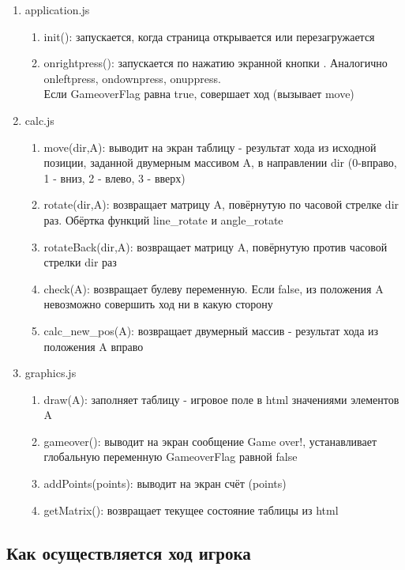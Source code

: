 \documentclass[a4paper,12pt]{article}
\newcommand{\lk}{\guillemotleft}
\newcommand{\rk}{\guillemotright}
\begin{document}
\begin{enumerate}
\item{application.js}
	\begin{enumerate}
	\item{init():} запускается, когда страница открывается или перезагружается
	\item{onrightpress():} запускается по нажатию экранной кнопки \rk. 			Аналогично onleftpress, ondownpress, onuppress.\\
	Если GameoverFlag равна true, совершает ход (вызывает move)
	\end{enumerate}
\item{calc.js}
	\begin{enumerate}
	\item{move(dir,A):} выводит на экран таблицу - результат хода из исходной 				позиции, заданной двумерным массивом A, в направлении dir (0-вправо, 1 - вниз, 2 		- влево, 3 - вверх) 
	\item{rotate(dir,A):} возвращает матрицу A, повёрнутую по часовой стрелке dir раз. 		Обёртка функций line\_rotate и angle\_rotate
	\item{rotateBack(dir,A):} возвращает матрицу A, повёрнутую против часовой 			стрелки dir раз
	\item{check(A):} возвращает булеву переменную. Если false, из положения A 			невозможно совершить ход ни в какую сторону
	\item{calc\_new\_pos(A):} возвращает двумерный массив - результат хода из положения A вправо
	\end{enumerate}
\item{graphics.js}
	\begin{enumerate}
	\item{draw(A):} заполняет таблицу - игровое поле в html значениями элементов A
	\item{gameover():} выводит на экран сообщение \lk Game over!\rk, устанавливает глобальную переменную GameoverFlag равной false
	\item{addPoints(points):} выводит на экран счёт (points)
	\item{getMatrix():} возвращает текущее состояние таблицы из html
	\end{enumerate}
\end{enumerate}
\subsection{Как осуществляется ход игрока}
\end{document}
